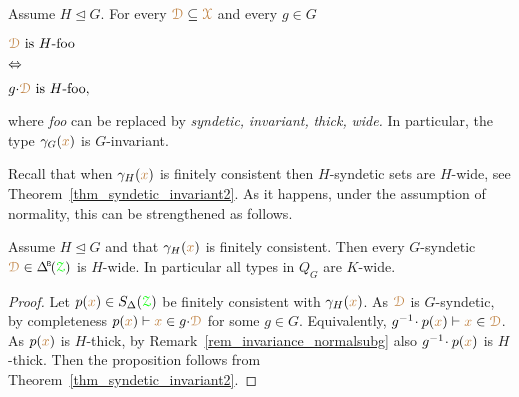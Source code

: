 \begin{remark}\label{rem_invariance_normalsubg}
\def\medrel#1{\parbox[t]{5ex}{$\displaystyle\hfil #1$}}
\def\ceq#1#2#3{\parbox[t]{20ex}{$\displaystyle #1$}\medrel{#2}{$\displaystyle #3$}}
  Assume $H\trianglelefteq G$.
  For every ${\color{brown}\EuScript D}\subseteq{\color{brown}\EuScript X}$ and every $g\in G$ \smallskip
  
  \ceq{\hfill\mrD\textrm{ is }H\textrm{-foo}}{\IFF}{g{\cdot}\mrD\textrm{ is }H\textrm{-foo},} \smallskip
  
  where \textit{foo\/} can be replaced by \textit{syndetic,} \textit{invariant,} \textit{thick,} \textit{wide.}
  In particular, the type $\gamma_G({\color{brown} x})$ is $G$-invariant.
\end{remark}

Recall that when $\gamma_H({\color{brown} x})$ is finitely consistent then $H$-syndetic sets are $H$-wide, see Theorem~\ref{thm_syndetic_invariant2}.
As it happens, under the assumption of normality, this can be strengthened as follows.

\begin{proposition}\label{prop_Gsyndetic_Hthick1}
  Assume $H\trianglelefteq G$ and that $\gamma_H({\color{brown} x})$ is finitely consistent.
  Then every $G$-syndetic $\mrD\in\BDelta(\grZ)$ is $H$-wide.
  In particular all types in $Q_G$ are $K$-wide.
\end{proposition}

\begin{proof}
  Let $p({\color{brown} x})\in S_\Delta({\color{green}\EuScript Z})$ be finitely consistent with $\gamma_H({\color{brown} x})$.
  As ${\color{brown}\EuScript D}$ is $G$-syndetic, by completeness $p({\color{brown} x})\vdash{\color{brown}x}\in g{\cdot}{\color{brown}\EuScript D}$ for some $g\in G$.
  Equivalently, $g^{-1}\!\cdot p({\color{brown} x})\vdash{\color{brown}x}\in{\color{brown}\EuScript D}$.
  As $p({\color{brown} x})$ is $H$-thick, by Remark~\ref{rem_invariance_normalsubg} also $g^{-1}\!\cdot p({\color{brown} x})$ is $H$-thick.
  Then the proposition follows from Theorem~\ref{thm_syndetic_invariant2}.
\end{proof}

